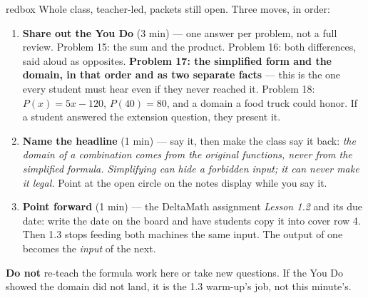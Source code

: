 \documentclass[10pt]{article}
\begin{document}
\boxguard[20]
\begin{skillbox}{redbox}
Whole class, teacher-led, packets still open. Three moves, in order:
\begin{enumerate}[itemsep=3pt]
  \item \textbf{Share out the You Do} (3 min) --- one answer per problem, not a
        full review. Problem 15: the sum and the product. Problem 16: both
        differences, said aloud as opposites. \textbf{Problem 17: the simplified
        form and the domain, in that order and as two separate facts} --- this is
        the one every student must hear even if they never reached it. Problem
        18: $P(x) = 5x - 120$, $P(40) = 80$, and a domain a food truck could
        honor. If a student answered the extension question, they present it.
  \item \textbf{Name the headline} (1 min) --- say it, then make the class say it
        back: \textit{the domain of a combination comes from the original
        functions, never from the simplified formula. Simplifying can hide a
        forbidden input; it can never make it legal.} Point at the open circle on
        the notes display while you say it.
  \item \textbf{Point forward} (1 min) --- the DeltaMath assignment
        \textit{Lesson 1.2} and its due date: write the date on the board and
        have students copy it into cover row 4. Then 1.3 stops feeding both
        machines the same input. The output of one becomes the \textit{input} of
        the next.
\end{enumerate}
\textbf{Do not} re-teach the formula work here or take new questions. If the You
Do showed the domain did not land, it is the 1.3 warm-up's job, not this
minute's.
\end{skillbox}
\end{document}
